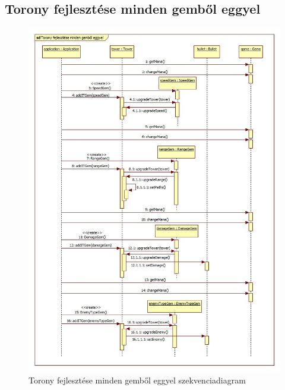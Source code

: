 \subsection{Torony fejlesztése minden gemből eggyel}
\begin{figure}[H]
\begin{center}
\includegraphics[width=17cm]{chapters/chapter05/images/sd_Torony_fejlesztese_minden_gembol_eggyel.jpg}
\caption{Torony fejlesztése minden gemből eggyel szekvenciadiagram}
\label{fig:sd_Torony_fejlesztese_minden_gembol_eggyel}
\end{center}
\end{figure}

